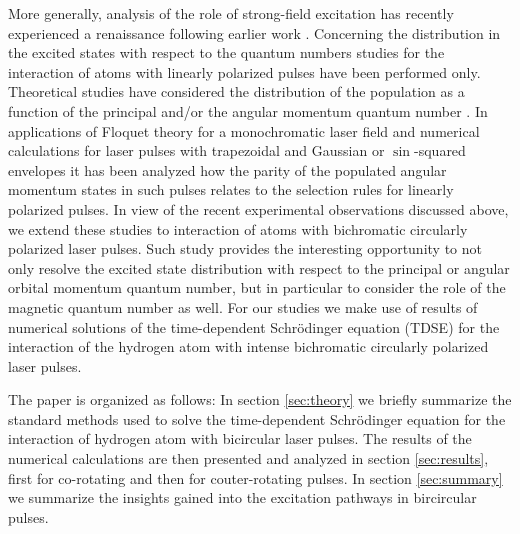 More generally, analysis of the role of strong-field excitation has recently experienced a renaissance 
\cite{nubbemeyer09,eichmann13,chini14,zimmermann15} 
following earlier work 
\cite{freeman87,perry89,agostini89}.
Concerning the distribution in the excited states with respect to the quantum numbers studies for the interaction of atoms with linearly polarized pulses have been performed only. Theoretical studies have considered the distribution of the population as a function of the principal and/or the angular momentum quantum number \cite{krajewska12,li14,li14b,xiong17b,piraux17,venzke18}. In applications of Floquet theory for a monochromatic laser field \cite{krajewska12} and numerical calculations for laser pulses with  trapezoidal \cite{piraux17} and Gaussian or $\sin$-squared envelopes \cite{venzke18} it has been analyzed how the parity of the populated angular momentum states in such pulses relates to the selection rules for linearly polarized pulses. In view of the recent experimental observations discussed above, we extend these studies to interaction of atoms with bichromatic circularly polarized laser pulses. Such study provides the interesting opportunity to not only resolve the excited state distribution with respect to the principal or angular orbital momentum quantum number, but in particular to consider the role of the magnetic quantum number as well. For our studies we make use of results of numerical solutions of the time-dependent Schr\"odinger equation (TDSE) for the interaction of the hydrogen atom with intense bichromatic circularly polarized laser pulses.

The paper is organized as follows: In section \ref{sec:theory} we briefly summarize the standard methods used to solve the time-dependent Schr\"odinger equation for the interaction of hydrogen atom with bicircular laser pulses. The results of the numerical calculations are then presented and analyzed in section \ref{sec:results}, first for co-rotating and then for couter-rotating pulses. In section \ref{sec:summary} we summarize the insights gained into the excitation pathways in bircircular pulses. 


